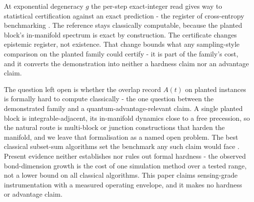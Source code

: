 At exponential degeneracy $g$ the per-step exact-integer read gives way to statistical certification against an exact prediction - the register of cross-entropy benchmarking \cite{boixo2018xeb}. The reference stays classically computable, because the planted block's in-manifold spectrum is exact by construction. The certificate changes epistemic register, not existence. That change bounds what any sampling-style comparison on the planted family could certify - it is part of the family's cost, and it converts the demonstration into neither a hardness claim nor an advantage claim.

The question left open is whether the overlap record $A(t)$ on planted instances is formally hard to compute classically - the one question between the demonstrated family and a quantum-advantage-relevant claim. A single planted block is integrable-adjacent, its in-manifold dynamics close to a free precession, so the natural route is multi-block or junction constructions that harden the manifold, and we leave that formalisation as a named open problem. The best classical subset-sum algorithms set the benchmark any such claim would face \cite{bonnetain2020improved}. Present evidence neither establishes nor rules out formal hardness - the observed bond-dimension growth is the cost of one simulation method over a tested range, not a lower bound on all classical algorithms. This paper claims sensing-grade instrumentation with a measured operating envelope, and it makes no hardness or advantage claim.
